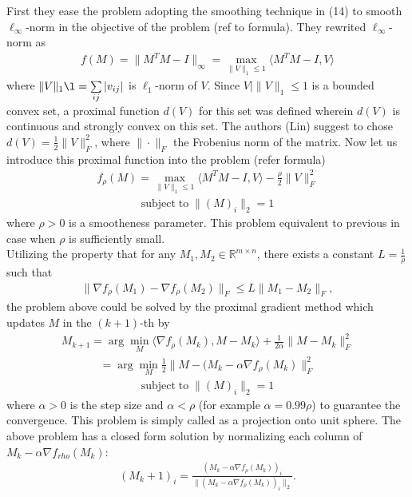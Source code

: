 \documentclass[journal]{IEEEtran}
\begin{document}
First they ease the problem adopting the smoothing technique in (14) to smooth $\ell_{\infty}$-norm in the objective of the problem (ref to formula). They rewrited $\ell_{\infty}$-norm  as
\begin{align}
f(M)=\|M^TM-I\|_{\infty}=\max_{\|V\|_1\leq 1}\langle M^TM-I,V  \rangle
\end{align}
where $\|V\|_1\l=\sum\limits_{ij} | v_{ij}|$ is $\ell_{1}$-norm of $V$. Since ${V| \|V\|_1\leq 1}$ is a bounded convex set, a proximal function $d(V)$ for this set was defined wherein $d(V)$  is continuous and strongly convex on this set. The authors (Lin) suggest to chose $d(V)=\frac{1}{2}\|V \|_F^2$, where $\|\cdot\|_F$ the Frobenius norm of the matrix. Now let us introduce this proximal function into the problem (refer formula) 
\begin{align}
f_{\rho}(M)=\max_{\|V\|_1\leq 1}\langle M^TM-I,V  \rangle-\frac{\rho}{2}\|V \|_F^2
\end{align}
\begin{align}
\textrm{subject}\;\textrm{to} \;\|(M)_i\|_2=1
\end{align}
where $\rho > 0$ is a smootheness parameter. This problem equivalent to previous in case when $\rho$ is sufficiently small.\\ 
Utilizing the property that for any $M_1,M_2\in\mathbb{R}^{m\times n}$, there exists a constant $L=\frac{1}{\rho}$ such that 
\begin{align}
\|  \nabla f_{\rho}(M_1) - \nabla f_{\rho}(M_2) \|_F\leq L\| M_1-M_2\|_F,
\end{align}
the problem above could be solved by the proximal gradient method which updates $M$ in the $(k +1)$-th by
\begin{align}
M_{k+1}=\arg\min\limits_{M} \langle \nabla f_{\rho} (M_k), M-M_k\rangle+\frac{1}{2\alpha}\| M-M_k  \|_F^2
\end{align}
\begin{align}
=\arg\min\limits_{M} \frac{1}{2}\|  M-(M_k-\alpha \nabla f_{\rho} (M_k)\|_F^2
\end{align}
\begin{align}
\textrm{subject}\;\textrm{to} \;\|(M)_i\|_2=1
\end{align}
where $\alpha>0$ is the step size and $\alpha<\rho$ (for example $\alpha=0.99\rho$) to guarantee the convergence. This problem is simply called as a projection onto unit sphere. The above problem has a closed form solution by normalizing each column of $M_k-\alpha \nabla f_{rho} (M_k)$:
\begin{align}
(M_k+1)_i=\frac{(M_k-\alpha \nabla f_{\rho} (M_k))_i}{\|(M_k-\alpha \nabla f_{\rho} (M_k))_i\|_2}.
\end{align}
\end{document}
